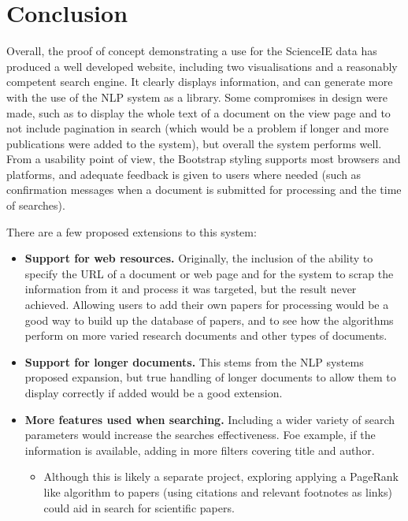 \section{Conclusion}
Overall, the proof of concept demonstrating a use for the ScienceIE data has produced a well developed website, including two visualisations and a reasonably competent search engine. It clearly displays information, and can generate more with the use of the NLP system as a library. Some compromises in design were made, such as to display the whole text of a document on the view page and to not include pagination in search (which would be a problem if longer and more publications were added to the system), but overall the system performs well. From a usability point of view, the Bootstrap styling supports most browsers and platforms, and adequate feedback is given to users where needed (such as confirmation messages when a document is submitted for processing and the time of searches).

There are a few proposed extensions to this system:
\begin{itemize}
	\item \textbf{Support for web resources.} Originally, the inclusion of the ability to specify the URL of a document or web page and for the system to scrap the information from it and process it was targeted, but the result never achieved. Allowing users to add their own papers for processing would be a good way to build up the database of papers, and to see how the algorithms perform on more varied research documents and other types of documents.
	\item \textbf{Support for longer documents.} This stems from the NLP systems proposed expansion, but true handling of longer documents to allow them to display correctly if added would be a good extension.
	\item \textbf{More features used when searching.} Including a wider variety of search parameters would increase the searches effectiveness. Foe example, if the information is available, adding in more filters covering title and author.
	\begin{itemize}
		\item Although this is likely a separate project, exploring applying a PageRank like algorithm to papers (using citations and relevant footnotes as links) could aid in search for scientific papers.
	\end{itemize}
\end{itemize}
